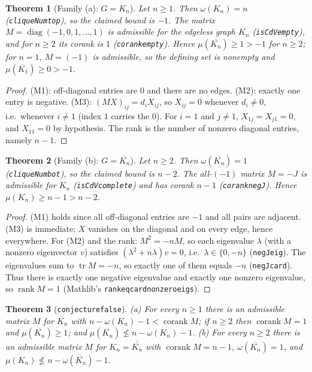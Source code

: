 \documentclass[11pt]{article}
\renewcommand{\_}{\oldus\allowbreak}
\newtheorem{theorem}{Theorem}
\theoremstyle{definition}
\theoremstyle{remark}
\begin{document}
\begin{theorem}[Family (a): $G=K_n$]
Let $n\ge1$. Then $\omega(K_n)=n$ (\texttt{cliqueNum\_top}), so the claimed bound is $-1$. The matrix
$M=\operatorname{diag}(-1,0,1,\dots,1)$ is admissible for the edgeless graph
$\overline{K_n}$ (\texttt{isCdV\_empty}), and for $n\ge2$ its corank is $1$
(\texttt{corank\_empty}). Hence $\mu(\overline{K_n})\ge1>-1$ for $n\ge2$; for $n=1$, $M=(-1)$ is
admissible, so the defining set is nonempty and $\mu(\overline{K_1})\ge0>-1$.
\end{theorem}
\begin{proof}
(M1): off-diagonal entries are $0$ and there are no edges. (M2): exactly one entry is negative. (M3):
$(MX)_{ij}=d_iX_{ij}$, so $X_{ij}=0$ whenever $d_i\ne0$, i.e.\ whenever $i\ne 1$ (index $1$ carries the
$0$). For $i=1$ and $j\ne1$, $X_{1j}=X_{j1}=0$, and $X_{11}=0$ by hypothesis. The rank is the number of
nonzero diagonal entries, namely $n-1$.
\end{proof}

\begin{theorem}[Family (b): $G=\overline{K_n}$]
Let $n\ge2$. Then $\omega(\overline{K_n})=1$ (\texttt{cliqueNum\_bot}), so the claimed bound is $n-2$.
The all-$(-1)$ matrix $M=-J$ is admissible for $K_n$ (\texttt{isCdV\_complete}) and has corank $n-1$
(\texttt{corank\_negJ}). Hence $\mu(K_n)\ge n-1>n-2$.
\end{theorem}
\begin{proof}
(M1) holds since all off-diagonal entries are $-1$ and all pairs are adjacent. (M3) is immediate: $X$
vanishes on the diagonal and on every edge, hence everywhere. For (M2) and the rank: $M^2=-nM$, so each
eigenvalue $\lambda$ (with a nonzero eigenvector $v$) satisfies $(\lambda^2+n\lambda)v=0$, i.e.\
$\lambda\in\{0,-n\}$ (\texttt{negJ\_eig}). The eigenvalues sum to $\operatorname{tr}M=-n$, so exactly
one of them equals $-n$ (\texttt{negJ\_card}). Thus there is exactly one negative eigenvalue and exactly
one nonzero eigenvalue, so $\operatorname{rank}M=1$ (Mathlib's \texttt{rank\_eq\_card\_non\_zero\_eigs}).
\end{proof}

\begin{theorem}[\texttt{conjecture\_2149\_false}]
(a) For every $n\ge1$ there is an admissible matrix $M$ for $\overline{K_n}$ with
$n-\omega(K_n)-1<\operatorname{corank}M$; if $n\ge2$ then $\operatorname{corank}M=1$ and
$\mu(\overline{K_n})\ge1$; and $\mu(\overline{K_n})\not\le n-\omega(K_n)-1$.
(b) For every $n\ge2$ there is an admissible matrix $M$ for $K_n=\overline{\overline{K_n}}$ with
$\operatorname{corank}M=n-1$, $\omega(\overline{K_n})=1$, and
$\mu(K_n)\not\le n-\omega(\overline{K_n})-1$.
\end{theorem}
\end{document}
